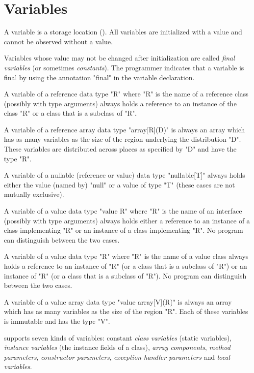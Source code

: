 
\chapter{Variables}\label{XtenVariables}

A variable is a storage location (). All
variables are initialized with a value and cannot be observed
without
a value.

Variables whose value may not be changed after initialization
are called {\em final variables} (or sometimes {\em constants}).
The programmer indicates that a variable is final by using the
annotation \xcd"final" in the variable declaration.


A variable of a reference data type \xcd"R" where \xcd"R" is the name
of a reference class (possibly with type arguments) always holds a
reference to an instance of the class \xcd"R" or a class that is a
subclass of \xcd"R". 

A variable of a reference array data type \xcd"array[R](D)" is always an
array which has as many variables as the size of the region underlying
the distribution \xcd"D". These variables are distributed across
places as specified by \xcd"D" and have the type \xcd"R".

A variable of a nullable (reference or value) data type \xcd"nullable[T]"
always holds either the value (named by) \xcd"null" or a value of
type \xcd"T" (these cases are not mutually exclusive).

A variable of a value data type \xcd"value R" where \xcd"R" is the
name of an interface (possibly with type arguments) always holds
either a reference to an instance of a class implementing \xcd"R" or
an instance of a class implementing \xcd"R". No program can
distinguish between the two cases.

A variable of a value data type \xcd"R" where \xcd"R" is the name of a
value class always holds a reference to an instance of \xcd"R" (or a
class that is a subclass of \xcd"R") or an instance of \xcd"R" (or a
class that is a subclass of \xcd"R"). No program can distinguish
between the two cases.

A variable of a value array data type \xcd"value array[V](R)" is always an
array which has as many variables as the size of the region \xcd"R".
Each of these variables is immutable and has the type \xcd"V".

\Xten{} supports seven kinds of variables: constant {\em class
variables} (static variables), {\em instance variables} (the instance
fields of a class), {\em array components}, {\em method parameters},
{\em constructor parameters}, {\em exception-handler parameters} and
{\em local variables}.

